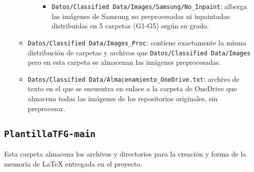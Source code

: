 \begin{itemize}
\begin{itemize}
\begin{itemize}
\begin{itemize}
                \item \texttt{Datos/Classified Data/Images/Samsung/No\_Inpaint}: alberga las imágenes de Samsung no preprocesadas ni inpaintadas distribuidas en 5 carpetas (G1-G5) según su grado.
            \end{itemize}
        \end{itemize}
        \item \texttt{Datos/Classified Data/Images\_Proc}: contiene exactamente la misma distribución de carpetas y archivos que \texttt{Datos/Classified Data/Images} pero en esta carpeta se almacenan las imágenes preprocesadas.
        \item \texttt{Datos/Classified Data/Almacenamiento\_OneDrive.txt}: archivo de texto en el que se encuentra en enlace a la carpeta de OneDrive que almacena todas las imágenes de los repositorios originales, sin preprocesar.
    \end{itemize}
\end{itemize}

\subsection{\texttt{PlantillaTFG-main}}

Esta carpeta almacena los archivos y directorios para la creación y forma de la memoria de LaTeX entregada en el proyecto. 

